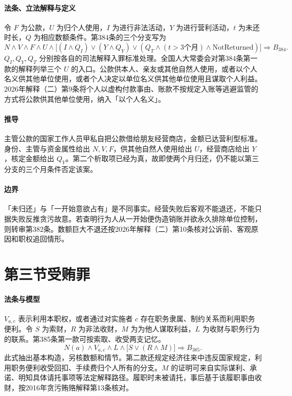 \paragraph{法条、立法解释与定义}
令 \(F\) 为公款，\(U\) 为归个人使用，\(I\) 为进行非法活动，\(Y\) 为进行营利活动，\(t\) 为未还时长，\(Q\) 为相应数额条件。第384条的三个分支写为
\[
N\land V\land F\land U\land
\bigl[(I\land Q_I)\lor(Y\land Q_Y)\lor
(Q_T\land(t>3\text{个月})\land\mathrm{NotReturned})\bigr]
\Longrightarrow B_{384}.
\]
\(Q_I,Q_Y,Q_T\) 分别按各自的司法解释入罪标准处理。全国人大常委会对第384条第一款的解释列举三个 \(U\) 的入口。公款供本人、亲友或其他自然人使用，或者以个人名义供其他单位使用，或者个人决定以单位名义供其他单位使用且谋取个人利益。2026年解释（二）第9条将个人以虚构付款事由、账款不按规定入账等逃避监管的方式将公款供其他单位使用，纳入「以个人名义」。

\paragraph{推导}
主管公款的国家工作人员甲私自把公款借给朋友经营商店，金额已达营利型标准。身份、主管与资金属性给出 \(N,V,F\)，供其他自然人使用给出 \(U\)，经营商店给出 \(Y\)，核定金额给出 \(Q_Y\)。第二个析取项已经为真，故即使两个月归还，仍不能以第三分支的三个月条件否定该案。

\paragraph{边界}
「未归还」与「一开始意欲占有」是不同事实。经营失败后客观不能退还，不能只据失败反推贪污故意。若查明行为人从一开始便伪造销账并欲永久排除单位控制，则转审第382条。数额巨大不退还按2026年解释（二）第10条核对公诉前、客观原因和职权追回情形。

\section{第三节\quad 受贿罪}

\paragraph{法条与模型}
\(V_{a,c}\) 表示利用本职权，或者通过对实施者 \(c\) 存在职务隶属、制约关系而利用职务便利。令 \(S\) 为索财，\(R\) 为非法收财，\(M\) 为为他人谋取利益，\(L\) 为收财与职务行为的联系。第385条第一款可按索取、收受两支记忆。
\[
N(a)\land V_{a,c}\land L\land
\bigl[S\lor (R\land M)\bigr]\Longrightarrow B_{385}.
\]
此式抽出基本构造，另核数额和情节。第二款还规定经济往来中违反国家规定，利用职务便利收受回扣、手续费归个人所有的分支。\(M\) 的证明可来自实际谋利、承诺、明知具体请托事项等法定解释路径。履职时未被请托，事后基于该履职事由收财，按2016年贪污贿赂解释第13条核对。

